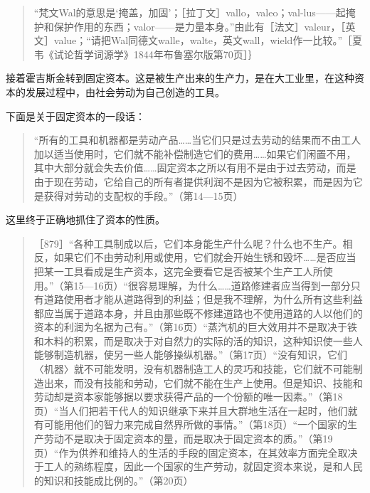 \begin{quote}{“梵文Wal的意思是‘掩盖，加固’；［拉丁文］vallo，valeo；val-lus——起掩护和保护作用的东西；valor——是力量本身。”由此有［法文］valeur，［英文］value；“请把Wal同德文walle，walte，英文wall，wield作一比较。”［夏韦《试论哲学词源学》1844年布鲁塞尔版第70页］｝}\end{quote}


接着霍吉斯金转到固定资本。这是被生产出来的生产力，是在大工业里，在这种资本的发展过程中，由社会劳动为自己创造的工具。

下面是关于固定资本的一段话：

\begin{quote}{“所有的工具和机器都是劳动产品……当它们只是过去劳动的结果而不由工人加以适当使用时，它们就不能补偿制造它们的费用……如果它们闲置不用，其中大部分就会失去价值……固定资本之所以有用不是由于过去劳动，而是由于现在劳动，它给自己的所有者提供利润不是因为它被积累，而是因为它是获得对劳动的支配权的手段。”（第14—15页）}\end{quote}

这里终于正确地抓住了资本的性质。

\begin{quote}{［879］“各种工具制成以后，它们本身能生产什么呢？什么也不生产。相反，如果它们不由劳动利用或使用，它们就会开始生锈和毁坏……是否应当把某一工具看成是生产资本，这完全要看它是否被某个生产工人所使用。”（第15—16页）“很容易理解，为什么……道路修建者应当得到一部分只有道路使用者才能从道路得到的利益；但是我不理解，为什么所有这些利益都应当属于道路本身，并且由那些既不修建道路也不使用道路的人以他们的资本的利润为名据为己有。”（第16页）“蒸汽机的巨大效用并不是取决于铁和木料的积累，而是取决于对自然力的实际的活的知识，这种知识使一些人能够制造机器，使另一些人能够操纵机器。”（第17页）“没有知识，它们〈机器〉就不可能发明，没有机器制造工人的灵巧和技能，它们就不可能制造出来，而没有技能和劳动，它们就不能在生产上使用。但是知识、技能和劳动却是资本家能够据以要求获得产品的一个份额的唯一因素。”（第18页）“当人们把若干代人的知识继承下来并且大群地生活在一起时，他们就有可能用他们的智力来完成自然界所做的事情。”（第18页）“一个国家的生产劳动不是取决于固定资本的量，而是取决于固定资本的质。”（第19页）“作为供养和维持人的生活的手段的固定资本，在其效率方面完全取决于工人的熟练程度，因此一个国家的生产劳动，就固定资本来说，是和人民的知识和技能成比例的。”（第20页）}\end{quote}

